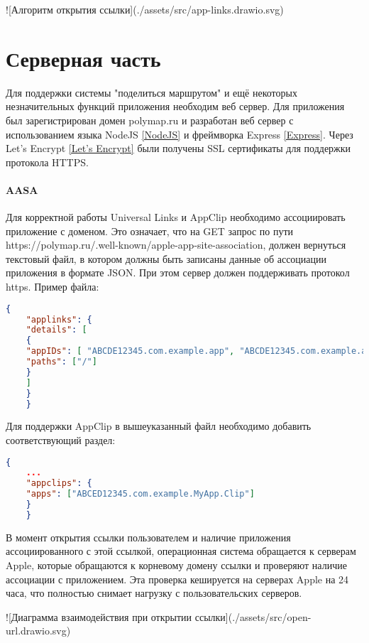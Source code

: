     ![Алгоритм открытия ссылки](./assets/src/app-links.drawio.svg)

\chapter{Серверная часть}
  Для поддержки системы "поделиться маршрутом" и ещё некоторых незначительных функций приложения необходим веб сервер. Для приложения был зарегистрирован домен polymap.ru и разработан веб сервер с использованием языка NodeJS \ref{NodeJS} и фреймворка Express \ref{Express}. Через Let’s Encrypt \ref{Let’s Encrypt} были получены SSL сертификаты для поддержки протокола HTTPS.

  \subsubsection{AASA}
    Для корректной работы Universal Links и AppClip необходимо ассоциировать приложение с доменом. Это означает, что на GET запрос по пути https://polymap.ru/.well-known/apple-app-site-association, должен вернуться текстовый файл, в котором должны быть записаны данные об ассоциации приложения в формате JSON. При этом сервер должен поддерживать протокол https. Пример файла:

    \begin{lstlisting}[language=json,caption={-}]
    {
    "applinks": {
    "details": [
    {
    "appIDs": [ "ABCDE12345.com.example.app", "ABCDE12345.com.example.app2" ],
    "paths": ["/"]
    }
    ]
    }
    }
  \end{lstlisting}

    Для поддержки AppClip в вышеуказанный файл необходимо добавить соответствующий раздел:

    \begin{lstlisting}[language=json,caption={-}]
    {
    ...
    "appclips": {
    "apps": ["ABCED12345.com.example.MyApp.Clip"]
    }
    }
  \end{lstlisting}

    В момент открытия ссылки пользователем и наличие приложения ассоциированного с этой ссылкой, операционная система обращается к серверам Apple, которые обращаются к корневому домену ссылки и проверяют наличие ассоциации с приложением. Эта проверка кешируется на серверах Apple на 24 часа, что полностью снимает нагрузку с пользовательских серверов.

    ![Диаграмма взаимодействия при открытии ссылки](./assets/src/open-url.drawio.svg)

